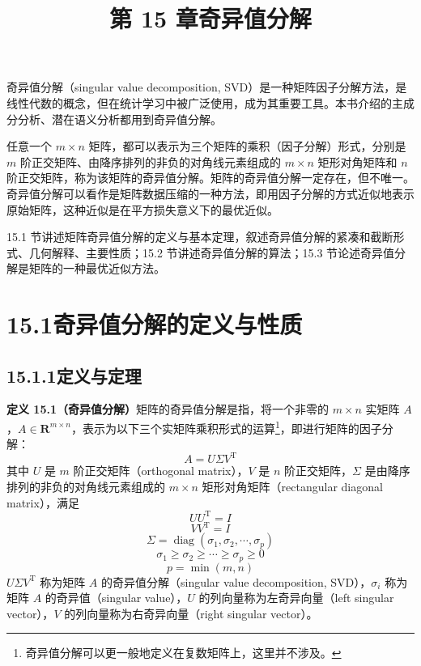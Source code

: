 \documentclass[UTF8,12pt,a4paper,fontset=fandol]{ctexart}
\title{第 15 章\quad 奇异值分解}
\author{}
\date{}
\begin{document}
\maketitle

奇异值分解（singular value decomposition, SVD）是一种矩阵因子分解方法，是线性代数的概念，但在统计学习中被广泛使用，成为其重要工具。本书介绍的主成分分析、潜在语义分析都用到奇异值分解。

任意一个 $m\times n$ 矩阵，都可以表示为三个矩阵的乘积（因子分解）形式，分别是 $m$ 阶正交矩阵、由降序排列的非负的对角线元素组成的 $m\times n$ 矩形对角矩阵和 $n$ 阶正交矩阵，称为该矩阵的奇异值分解。矩阵的奇异值分解一定存在，但不唯一。奇异值分解可以看作是矩阵数据压缩的一种方法，即用因子分解的方式近似地表示原始矩阵，这种近似是在平方损失意义下的最优近似。

15.1 节讲述矩阵奇异值分解的定义与基本定理，叙述奇异值分解的紧凑和截断形式、几何解释、主要性质；15.2 节讲述奇异值分解的算法；15.3 节论述奇异值分解是矩阵的一种最优近似方法。

\section*{15.1\quad 奇异值分解的定义与性质}

\subsection*{15.1.1\quad 定义与定理}

\noindent\textbf{定义 15.1（奇异值分解）}\quad 矩阵的奇异值分解是指，将一个非零的 $m\times n$ 实矩阵 $A$，$A\in\mathbf{R}^{m\times n}$，表示为以下三个实矩阵乘积形式的运算\footnote{奇异值分解可以更一般地定义在复数矩阵上，这里并不涉及。}，即进行矩阵的因子分解：
\begin{equation}
A=U\Sigma V^{\mathrm{T}}
\tag{15.1}
\end{equation}
其中 $U$ 是 $m$ 阶正交矩阵（orthogonal matrix），$V$ 是 $n$ 阶正交矩阵，$\Sigma$ 是由降序排列的非负的对角线元素组成的 $m\times n$ 矩形对角矩阵（rectangular diagonal matrix），满足
\[
UU^{\mathrm{T}}=I
\]
\[
VV^{\mathrm{T}}=I
\]
\[
\Sigma=\operatorname{diag}(\sigma_1,\sigma_2,\cdots,\sigma_p)
\]
\[
\sigma_1\geqslant\sigma_2\geqslant\cdots\geqslant\sigma_p\geqslant0
\]
\[
p=\min(m,n)
\]
$U\Sigma V^{\mathrm{T}}$ 称为矩阵 $A$ 的奇异值分解（singular value decomposition, SVD），$\sigma_i$ 称为矩阵 $A$ 的奇异值（singular value），$U$ 的列向量称为左奇异向量（left singular vector），$V$ 的列向量称为右奇异向量（right singular vector）。
\end{document}
